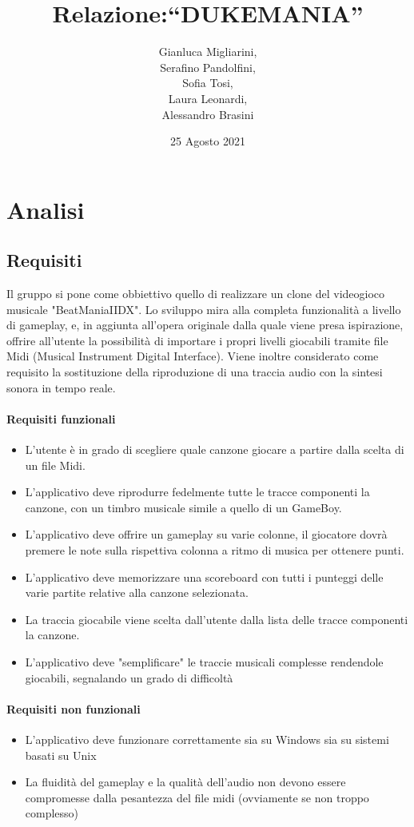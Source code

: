 \documentclass[a4paper,12pt]{report}
\title{Relazione:\break``DUKEMANIA''}
\author{Gianluca Migliarini, \\ Serafino Pandolfini,\\ Sofia Tosi,\\ Laura Leonardi, \\ Alessandro Brasini}
\date{25 Agosto 2021}
\begin{document}
\maketitle
\tableofcontents




\chapter{Analisi}
\section{Requisiti}
Il gruppo si pone come obbiettivo quello di realizzare un clone del videogioco musicale "BeatManiaIIDX".
Lo sviluppo mira alla completa funzionalità a livello di gameplay, e, in aggiunta all'opera originale
dalla quale viene presa ispirazione, offrire all'utente la possibilità di importare i propri livelli giocabili tramite file Midi (Musical Instrument Digital Interface). Viene inoltre considerato come requisito la sostituzione della riproduzione di una traccia audio con la sintesi sonora in tempo reale.
\subsubsection{Requisiti funzionali}
\begin{itemize}
	\item L'utente è in grado di scegliere quale canzone giocare a partire dalla scelta di un file Midi.
	\item L'applicativo deve riprodurre fedelmente tutte le tracce componenti la canzone, con un timbro musicale
	simile a quello di un GameBoy.
	\item L'applicativo deve offrire un gameplay su varie colonne, il giocatore dovrà premere le note sulla rispettiva colonna a ritmo di musica per ottenere punti.
	\item L'applicativo deve memorizzare una scoreboard con tutti i punteggi delle varie partite relative alla canzone selezionata.
	\item La traccia giocabile viene scelta dall'utente dalla lista delle tracce componenti la canzone.
	\item L'applicativo deve "semplificare" le traccie musicali complesse rendendole giocabili, segnalando un grado di difficoltà
\end{itemize}

\subsubsection{Requisiti non funzionali}
\begin{itemize}
	\item L'applicativo deve funzionare correttamente sia su Windows sia su sistemi basati su Unix
	\item La fluidità del gameplay e la qualità dell'audio non devono essere compromesse dalla pesantezza del file midi (ovviamente se non troppo complesso)
\end{itemize}
\newpage
\end{document}
